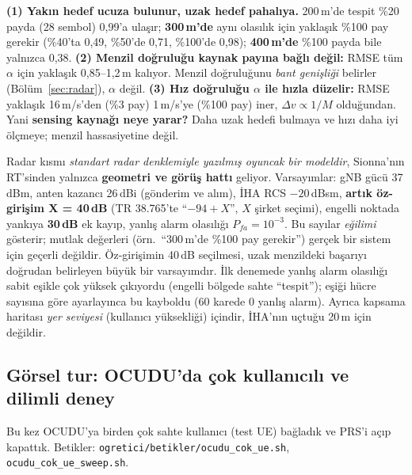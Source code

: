 \begin{bulgu}
\textbf{(1) Yakın hedef ucuza bulunur, uzak hedef pahalıya.} 200\,m'de tespit \%20 payda (28 sembol) 0,99'a ulaşır; \textbf{300\,m'de} aynı olasılık için yaklaşık \%100 pay gerekir (\%40'ta 0,49, \%50'de 0,71, \%100'de 0,98); \textbf{400\,m'de} \%100 payda bile yalnızca 0,38.
\textbf{(2) Menzil doğruluğu kaynak payına bağlı değil:} RMSE tüm $\alpha$ için yaklaşık 0,85--1,2\,m kalıyor. Menzil doğruluğunu \emph{bant genişliği} belirler (Bölüm~\ref{sec:radar}), $\alpha$ değil.
\textbf{(3) Hız doğruluğu $\alpha$ ile hızla düzelir:} RMSE yaklaşık 16\,m/s'den (\%3 pay) 1\,m/s'ye (\%100 pay) iner, $\Delta v \propto 1/M$ olduğundan.
Yani \textbf{sensing kaynağı neye yarar?} Daha uzak hedefi bulmaya ve hızı daha iyi ölçmeye; menzil hassasiyetine değil.
\end{bulgu}

\begin{dikkat}
Radar kısmı \emph{standart radar denklemiyle yazılmış oyuncak bir modeldir}, Sionna'nın RT'sinden yalnızca \textbf{geometri ve görüş hattı} geliyor. Varsayımlar:
gNB gücü 37\,dBm, anten kazancı 26\,dBi (gönderim ve alım), İHA RCS $-20$\,dBsm, \textbf{artık öz-girişim X = 40\,dB} (TR 38.765'te ``$-94+X$'', $X$ şirket seçimi), engelli noktada yankıya \textbf{30\,dB} ek kayıp, yanlış alarm olasılığı $P_{fa}=10^{-3}$.
Bu sayılar \emph{eğilimi} gösterir; mutlak değerleri (örn.\ ``300\,m'de \%100 pay gerekir'') gerçek bir sistem için geçerli değildir. Öz-girişimin 40\,dB seçilmesi, uzak menzildeki başarıyı doğrudan belirleyen büyük bir varsayımdır.
İlk denemede yanlış alarm olasılığı sabit eşikle çok yüksek çıkıyordu (engelli bölgede sahte ``tespit''); eşiği hücre sayısına göre ayarlayınca bu kayboldu (60 karede 0 yanlış alarm).
Ayrıca kapsama haritası \emph{yer seviyesi} (kullanıcı yüksekliği) içindir, İHA'nın uçtuğu 20\,m için değildir.
\end{dikkat}

\subsection{Görsel tur: OCUDU'da çok kullanıcılı ve dilimli deney}\label{sec:ocudu-cokue}

Bu kez OCUDU'ya birden çok sahte kullanıcı (test UE) bağladık ve PRS'i açıp kapattık. Betikler: \texttt{ogretici/betikler/ocudu\_cok\_ue.sh}, \texttt{ocudu\_cok\_ue\_sweep.sh}.

